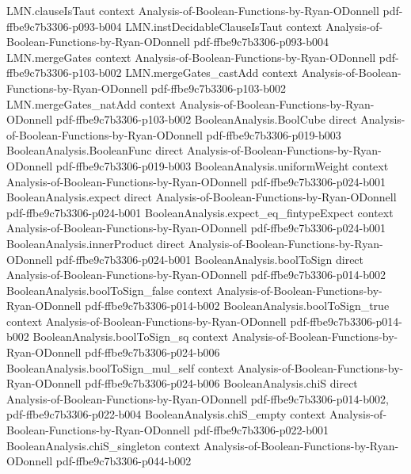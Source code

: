 \begin{lemma}
  {LMN.clauseIsTaut}
  {context}
  {Analysis-of-Boolean-Functions-by-Ryan-ODonnell}
  {pdf-ffbe9c7b3306-p093-b004}
\proofstep
  {LMN.instDecidableClauseIsTaut}
  {context}
  {Analysis-of-Boolean-Functions-by-Ryan-ODonnell}
  {pdf-ffbe9c7b3306-p093-b004}
\proofstep
  {LMN.mergeGates}
  {context}
  {Analysis-of-Boolean-Functions-by-Ryan-ODonnell}
  {pdf-ffbe9c7b3306-p103-b002}
\proofstep
  {LMN.mergeGates_castAdd}
  {context}
  {Analysis-of-Boolean-Functions-by-Ryan-ODonnell}
  {pdf-ffbe9c7b3306-p103-b002}
\proofstep
  {LMN.mergeGates_natAdd}
  {context}
  {Analysis-of-Boolean-Functions-by-Ryan-ODonnell}
  {pdf-ffbe9c7b3306-p103-b002}
\proofstep
  {BooleanAnalysis.BoolCube}
  {direct}
  {Analysis-of-Boolean-Functions-by-Ryan-ODonnell}
  {pdf-ffbe9c7b3306-p019-b003}
\proofstep
  {BooleanAnalysis.BooleanFunc}
  {direct}
  {Analysis-of-Boolean-Functions-by-Ryan-ODonnell}
  {pdf-ffbe9c7b3306-p019-b003}
\proofstep
  {BooleanAnalysis.uniformWeight}
  {context}
  {Analysis-of-Boolean-Functions-by-Ryan-ODonnell}
  {pdf-ffbe9c7b3306-p024-b001}
\proofstep
  {BooleanAnalysis.expect}
  {direct}
  {Analysis-of-Boolean-Functions-by-Ryan-ODonnell}
  {pdf-ffbe9c7b3306-p024-b001}
\proofstep
  {BooleanAnalysis.expect_eq_fintypeExpect}
  {context}
  {Analysis-of-Boolean-Functions-by-Ryan-ODonnell}
  {pdf-ffbe9c7b3306-p024-b001}
\proofstep
  {BooleanAnalysis.innerProduct}
  {direct}
  {Analysis-of-Boolean-Functions-by-Ryan-ODonnell}
  {pdf-ffbe9c7b3306-p024-b001}
\proofstep
  {BooleanAnalysis.boolToSign}
  {direct}
  {Analysis-of-Boolean-Functions-by-Ryan-ODonnell}
  {pdf-ffbe9c7b3306-p014-b002}
\proofstep
  {BooleanAnalysis.boolToSign_false}
  {context}
  {Analysis-of-Boolean-Functions-by-Ryan-ODonnell}
  {pdf-ffbe9c7b3306-p014-b002}
\proofstep
  {BooleanAnalysis.boolToSign_true}
  {context}
  {Analysis-of-Boolean-Functions-by-Ryan-ODonnell}
  {pdf-ffbe9c7b3306-p014-b002}
\proofstep
  {BooleanAnalysis.boolToSign_sq}
  {context}
  {Analysis-of-Boolean-Functions-by-Ryan-ODonnell}
  {pdf-ffbe9c7b3306-p024-b006}
\proofstep
  {BooleanAnalysis.boolToSign_mul_self}
  {context}
  {Analysis-of-Boolean-Functions-by-Ryan-ODonnell}
  {pdf-ffbe9c7b3306-p024-b006}
\proofstep
  {BooleanAnalysis.chiS}
  {direct}
  {Analysis-of-Boolean-Functions-by-Ryan-ODonnell}
  {pdf-ffbe9c7b3306-p014-b002,
    pdf-ffbe9c7b3306-p022-b004}
\proofstep
  {BooleanAnalysis.chiS_empty}
  {context}
  {Analysis-of-Boolean-Functions-by-Ryan-ODonnell}
  {pdf-ffbe9c7b3306-p022-b001}
\proofstep
  {BooleanAnalysis.chiS_singleton}
  {context}
  {Analysis-of-Boolean-Functions-by-Ryan-ODonnell}
  {pdf-ffbe9c7b3306-p044-b002}

\end{lemma}
